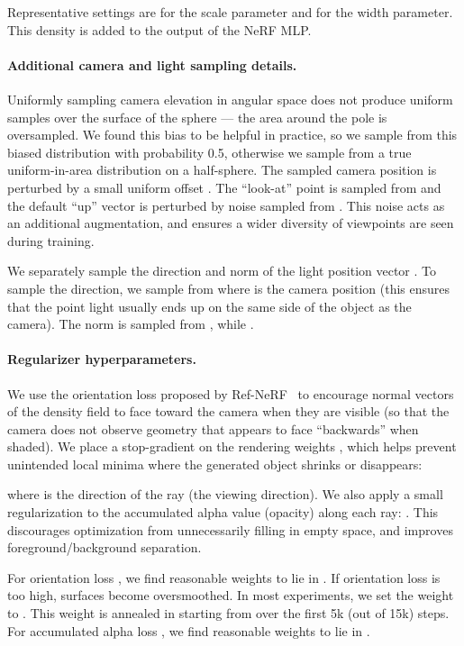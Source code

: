 \documentclass{article} \usepackage{iclr2023_conference,times}
\begin{document}
Representative settings are  for the scale parameter and  for the width parameter. This density is added to the  output of the NeRF MLP.



\paragraph{Additional camera and light sampling details.}
Uniformly sampling camera elevation  in angular space does not produce uniform samples over the surface of the sphere --- the area around the pole is oversampled. We  found this bias to be helpful in practice, so we sample  from this biased distribution with probability 0.5, otherwise we sample from a true uniform-in-area distribution on a half-sphere.
The sampled camera position is perturbed by a small uniform offset . The ``look-at'' point is sampled from  and the default ``up'' vector is perturbed by noise sampled from . This noise acts as an additional augmentation, and ensures a wider diversity of viewpoints are seen during training.

We separately sample the direction and norm of the light position vector . To sample the direction, we sample from  where  is the camera position (this ensures that the point light usually ends up on the same side of the object as the camera). The norm  is sampled from , while  .

\paragraph{Regularizer hyperparameters.} 
We use the orientation loss proposed by Ref-NeRF~\citep{verbin2022refnerf} to encourage normal vectors of the density field to face toward the camera when they are visible (so that the camera does not observe geometry that appears to face ``backwards'' when shaded). We place a stop-gradient on the rendering weights , which helps prevent unintended local minima where the generated object shrinks or disappears:

where  is the direction of the ray (the viewing direction).
We also apply a small regularization to the accumulated alpha value (opacity) along each ray: . This discourages optimization from unnecessarily filling in empty space, and improves foreground/background separation.


For orientation loss , we find reasonable weights to lie in . If orientation loss is too high, surfaces become oversmoothed. In most experiments, we set the weight to . This weight is annealed in starting from  over the first 5k (out of 15k) steps.
For accumulated alpha loss  , we find reasonable weights to lie in .
\end{document}
